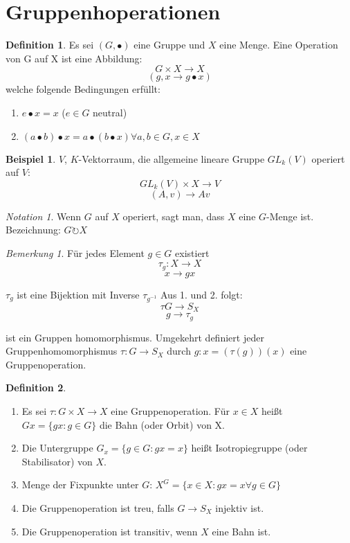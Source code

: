 \documentclass[12pt]{scrartcl}%
\theoremstyle{definition}
\newtheorem*{defn}{Definition}
\newtheorem{ex}{Beispiel}
\theoremstyle{remark}
\newtheorem*{notation}{Notation}
\newtheorem*{nb}{Bemerkung}
\begin{document}
\section{Gruppenhoperationen}
	\begin{defn}
	Es sei $(G, \bullet)$ eine Gruppe und $X$ eine Menge. Eine Operation von G auf X ist eine Abbildung:
	$$G \times X \rightarrow X$$
	$$(g,x \rightarrow g\bullet x)$$
	welche folgende Bedingungen erfüllt:
	\begin{enumerate}
		\item $e \bullet x = x$ ($e\in G$ neutral)
		\item $(a\bullet b)\bullet x = a\bullet (b\bullet x) \forall a,b\in G, x\in X$
	\end{enumerate}
	\end{defn}
	
	\begin{ex}
	$V$, $K$-Vektorraum, die allgemeine lineare Gruppe $GL_k(V)$ operiert auf $V$:
	$$GL_k(V) \times X \rightarrow V$$
	$$(A,v)\rightarrow Av$$
	\end{ex}

	\begin{notation}
	Wenn $G$ auf $X$ operiert, sagt man, dass $X$ eine $G$-Menge ist. Bezeichnung: $G\circlearrowright X$
	\end{notation}

	\begin{nb}
	F\"ur jedes Element $g\in G$ existiert
	$$\tau_g: X \rightarrow X$$
	$$x \rightarrow gx$$
	\end{nb}
	
	$\tau_g$ ist eine Bijektion mit Inverse $\tau_{g^{-1}}$ Aus 1. und 2. folgt:
	$$\tau G \rightarrow S_X$$
	$$g \rightarrow \tau_g$$
	
	ist ein Gruppen homomorphismus. Umgekehrt definiert jeder Gruppenhomomorphismus $\tau: G \rightarrow S_X$ durch 
	$g: x=(\tau(g))(x)$ eine Gruppenoperation.
	
	\begin{defn}
	\begin{enumerate}
		\item Es sei $\tau: G \times X \rightarrow X$ eine Gruppenoperation. F\"ur $x\in X$ heißt $Gx=\{ gx : g \in G\}$ die Bahn (oder Orbit) von X. 
		\item Die Untergruppe $G_x=\{ g\in G : gx=x\}$ heißt Isotropiegruppe (oder Stabilisator) von $X$.
		\item Menge der Fixpunkte unter $G$: $X^G=\{ x \in X : gx=x \forall g \in G\}$
		\item Die Gruppenoperation ist treu, falls $G \rightarrow S_X$ injektiv ist.
		\item Die Gruppenoperation ist transitiv, wenn $X$ eine Bahn ist.
	\end{enumerate}
	\end{defn}
	
\end{document}
